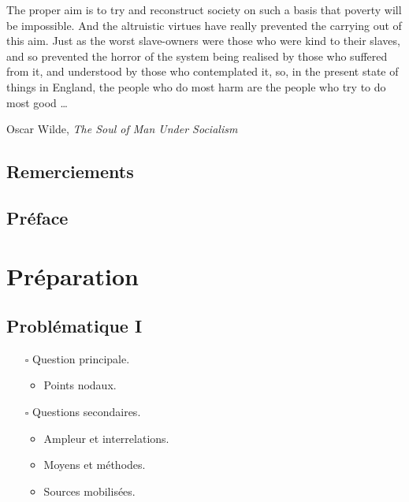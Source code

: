 \documentclass[paper=A4,portrait,twoside=true,twocolumn=false,headinclude=false,footinclude=false,fontsize=11,BCOR=15mm,DIV=calc,pagesize=auto,titlepage=firstiscover,mpinclude=true,headings=normal,headings=twolinechapter,open=right,chapterprefix=false,headsepline=false]{scrbook}
\begin{document}
The proper aim is to try and reconstruct society on such a basis that poverty will be impossible. And the altruistic virtues have really prevented the carrying out of this aim. Just as the worst slave-owners were those who were kind to their slaves, and so prevented the horror of the system being realised by those who suffered from it, and understood by those who contemplated it, so, in the present state of things in England, the people who do most harm are the people who try to do most good \ldots

\vspace{1\baselineskip}

\begin{FlushRight}
Oscar Wilde, \textit{The Soul of Man Under Socialism}
\end{FlushRight}

\vspace*{\fill}

\thispagestyle{empty}

\newpage 
\tableofcontents

\thispagestyle{empty}

\newpage 
\frontmatter
\pagestyle{plain}
\chapter{Remerciements} 

\lipsum
\chapter{Préface} 

\lipsum

\mainmatter
\pagestyle{scrheadings}
\part{Préparation}
\label{sec:org9bd7b63}
\chapter{Problématique I}
\label{sec:orgd0bad97}
\begin{itemize}
\item[{$\square$}] Question principale.
\begin{itemize}
\item Points nodaux.
\end{itemize}
\item[{$\square$}] Questions secondaires.
\begin{itemize}
\item Ampleur et interrelations.
\item Moyens et méthodes.
\item Sources mobilisées.
\end{itemize}
\end{itemize}
\end{document}

